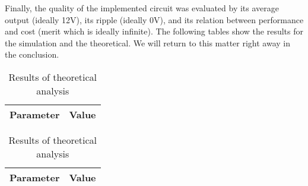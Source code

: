 \newpage
Finally, the quality of the implemented circuit was evaluated by its average output (ideally 12V), its ripple (ideally 0V), and its relation between performance and cost (merit which is ideally infinite). The following tables show the results for the simulation and the theoretical. We will return to this matter right away in the conclusion.

\begin{table}[!htb]
  \begin{minipage}{.5\linewidth}
     \centering
  \begin{tabular}{|c|c|}
    \hline    
    {\bf Parameter} & {\bf Value} \\ \hline
    
 \end{tabular}
 \caption{Results of simulation analysis}
 \label{tab:sim}
  \end{minipage}%
    \hspace{2 mm}
    \begin{minipage}{.5\linewidth}
      \centering
        \begin{tabular}{|c|c|}
    \hline    
    {\bf Parameter} & {\bf Value} \\ \hline
    
 \end{tabular}
        \caption{Results of theoretical analysis}
        \label{comppar}
    \end{minipage} 
\end{table}



\newpage

